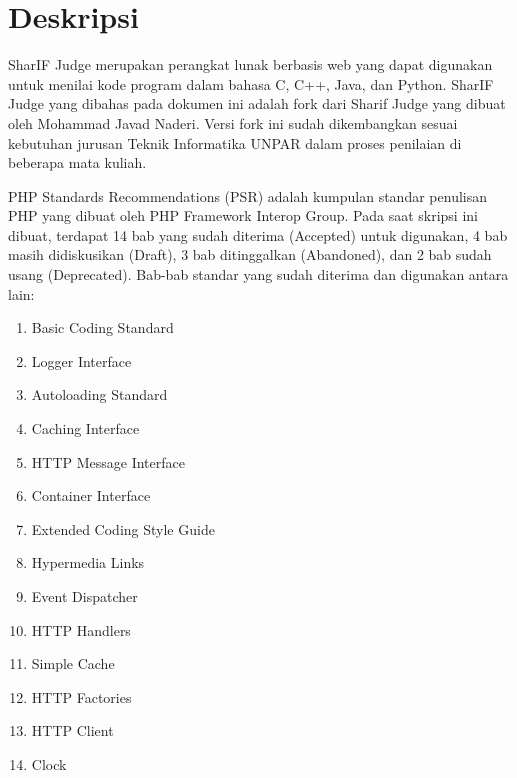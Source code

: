 \documentclass[a4paper,twoside]{article}
\begin{document}
\title{\@judultopik}
\author{\nama \textendash \@npm} 

\newcommand{\nama}{Nicholas Khrisna Sandyawan}
\newcommand{\@npm}{6181801060}
\newcommand{\@judultopik}{Evaluasi PHP Standards Recommendations pada proyek SharIF Judge} %
\newcommand{\jumpemb}{1} %
\newcommand{\tanggal}{27/03/2023}


\maketitle


\section{Deskripsi}
SharIF Judge merupakan perangkat lunak berbasis web yang dapat digunakan untuk menilai kode program dalam bahasa C, C++, Java, dan Python. SharIF Judge yang dibahas pada dokumen ini adalah fork dari Sharif Judge yang dibuat oleh Mohammad Javad Naderi. Versi fork ini sudah dikembangkan sesuai kebutuhan jurusan Teknik Informatika UNPAR dalam proses penilaian di beberapa mata kuliah.

PHP Standards Recommendations (PSR) adalah kumpulan standar penulisan PHP yang dibuat oleh PHP Framework Interop Group. Pada saat skripsi ini dibuat, terdapat 14 bab yang sudah diterima (Accepted) untuk digunakan, 4 bab masih didiskusikan (Draft), 3 bab ditinggalkan (Abandoned), dan 2 bab sudah usang (Deprecated). Bab-bab standar yang sudah diterima dan digunakan antara lain: 
\begin {enumerate}
\item Basic Coding Standard
\item Logger Interface
\item Autoloading Standard
\item Caching Interface
\item HTTP Message Interface
\item Container Interface
\item Extended Coding Style Guide
\item Hypermedia Links
\item Event Dispatcher
\item HTTP Handlers
\item Simple Cache
\item HTTP Factories
\item HTTP Client
\item Clock
\end {enumerate}	
\end{document}
